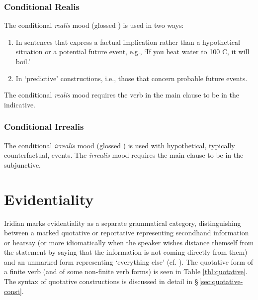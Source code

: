 \subsubsection{Conditional Realis}

\par The conditional \textit{realis} mood (glossed ) is used in two ways:
\begin{enumerate}
	\item In sentences that express a factual implication rather than a hypothetical situation or a potential future event, e.g., `If you heat water to 100 C, it will boil.'
	\item In `predictive' constructions, i.e., those that concern probable future events.
\end{enumerate}

The conditional \emph{realis} mood requires the verb in the main clause to be in the indicative.

\subsubsection{Conditional Irrealis}
The conditional \textit{irrealis} mood (glossed ) is used with hypothetical, typically counterfactual, events. The \emph{irrealis} mood requires the main clause to be in the subjunctive.

\section{Evidentiality}\label{sec:quotative}

Iridian marks {\cscaps evidentiality} as a separate grammatical category, distinguishing between a marked {\cscaps quotative} or {\cscaps reportative} representing secondhand information or hearsay (or more idiomatically when the speaker wishes distance themself from the statement by saying that the information is not coming directly from them) and an unmarked form representing `everything else' (cf. \cite[31-33]{aikhenvald2004}). The quotative form of a finite verb (and of some non-finite verb forms) is seen in Table \ref{tbl:quotative}. The syntax of quotative constructions is discussed in detail in \S\,\ref{sec:quotative-const}.


